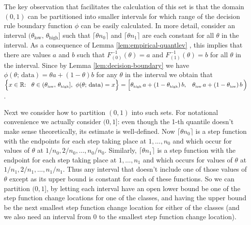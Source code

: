 \documentclass{article}
\begin{document}
The key observation that facilitates the calculation of this set is that the
domain $(0, 1)$ can be partitioned into smaller intervals for which range of the
decision rule boundary function $\phi$ can be easily calculated.  In more
detail, consider an interval
$(\theta_{\scriptscriptstyle\text{low}},\,
\theta_{\scriptscriptstyle\text{high}}]$ such that $\lceil \theta n_0 \rceil$
and $\lceil \theta n_1 \rceil$ are each constant for all $\theta$ in the
interval.  As a consequence of Lemma \ref{lem:empirical-quantlev} , this implies
that there are values $a$ and $b$ such that $F_{(0)}^{-1}(\theta) = a$ and
$F_{(1)}^{-1}(\theta) = b$ for all $\theta$ in the interval.  Since by Lemma
\ref{lem:decision-boundary} we have
$\phi(\theta;\, \text{data}) = \theta a + (1 - \theta) b$ for any $\theta$ in
the interval we obtain that
$\Big\{ x \in \mathbb{R}{:} \hspace{3mm} \theta \in
(\theta_{\scriptscriptstyle\text{low}},\,
\theta_{\scriptscriptstyle\text{high}}],~ \phi(\theta;\, \text{data}) = x \Big\}
= \Big[ \theta_{\scriptscriptstyle\text{high}}\, a + (1 -
\theta_{\scriptscriptstyle\text{high}})\, b, \hspace{3mm}
\theta_{\scriptscriptstyle\text{low}}\, a + (1 -
\theta_{\scriptscriptstyle\text{low}})\, b\, \Big)$.

Next we consider how to partition $(0, 1)$ into such sets.  For notational
convenience we actually consider $(0, 1]$: even though the 1-th quantile doesn't
make sense theoretically, its estimate is well-defined.  Now
$\lceil \theta n_0 \rceil$ is a step function with the endpoints for each step
taking place at $1, \dots, n_0$ and which occur for values of $\theta$ at
$1 / n_0, 2 / n_0, \dots, n_0 / n_0$.  Similarly, $\lceil \theta n_1 \rceil$ is
a step function with the endpoint for each step taking place at $1, \dots, n_1$
and which occurs for values of $\theta$ at $1 / n_1, 2 / n_1, \dots, n_1 / n_1$.
Thus any interval that doesn't include one of those values of $\theta$ except as
its upper bound is constant for each of these functions.  So we can partition
$(0, 1]$, by letting each interval have an open lower bound be one of the step
function change locations for one of the classes, and having the upper bound be
the next smallest step function change location for either of the classes (and
we also need an interval from 0 to the smallest step function change location).
\end{document}
